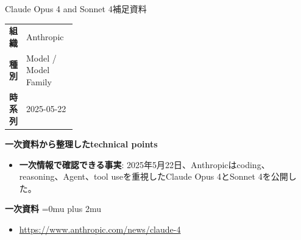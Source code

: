 \begin{technicalnote}{Claude Opus 4 and Sonnet 4}{補足資料}
\begingroup
\begin{tabularx}{\linewidth}{@{}>{\bfseries}p{0.22\linewidth}X@{}}
組織 & Anthropic \\
種別 & Model / Model Family \\
時系列 & 2025-05-22 \\
\end{tabularx}
\smallskip
\begin{minipage}{\linewidth}
{\bfseries 一次資料から整理したtechnical points}
\begin{itemize}[leftmargin=1.5em,itemsep=0.35em]
\item \textbf{一次情報で確認できる事実}: 2025年5月22日、Anthropicはcoding、reasoning、Agent、tool useを重視したClaude Opus 4とSonnet 4を公開した。
\end{itemize}
\begin{samepage}
{\bfseries 一次資料}
\begingroup\sloppy
\Urlmuskip=0mu plus 2mu\relax
\begin{itemize}[leftmargin=1.5em,itemsep=0.25em]
\item {\scriptsize\url{https://www.anthropic.com/news/claude-4}}
\end{itemize}
\endgroup
\end{samepage}
\end{minipage}
\endgroup
\end{technicalnote}
\medskip

